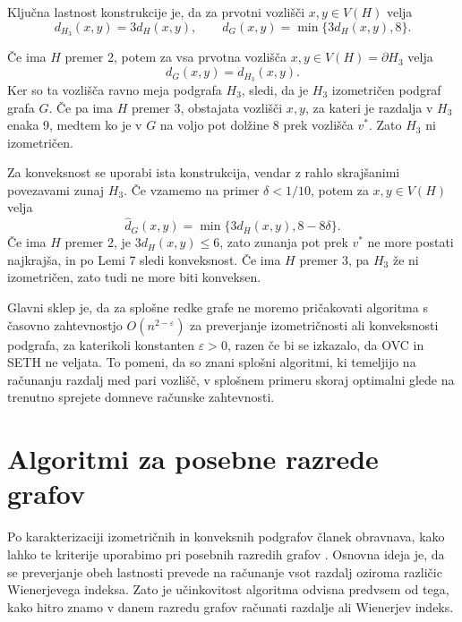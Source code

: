 \documentclass[sigconf
]{acmart}
\theoremstyle{definition}
\begin{document}
Ključna lastnost konstrukcije je, da za prvotni vozlišči \(x,y \in V(H)\) velja
\begin{equation}
d_{H_3}(x,y)=3d_H(x,y),
\qquad
d_G(x,y)=\min\{3d_H(x,y),8\}.
\end{equation}

Če ima \(H\) premer 2, potem za vsa prvotna vozlišča \(x,y\in V(H)=\partial H_3\) velja
\begin{equation}
d_G(x,y)=d_{H_3}(x,y).
\end{equation}
Ker so ta vozlišča ravno meja podgrafa \(H_3\), sledi, da je \(H_3\) izometričen podgraf grafa \(G\). Če pa ima \(H\) premer 3, obstajata vozlišči \(x,y\), za kateri
je razdalja v \(H_3\) enaka 9, medtem ko je v \(G\) na voljo pot dolžine 8 prek vozlišča
\(v^*\). Zato \(H_3\) ni izometričen. 

Za konveksnost se uporabi ista konstrukcija, vendar z rahlo skrajšanimi povezavami zunaj \(H_3\). Če vzamemo na primer \(\delta<1/10\), potem za \(x,y\in V(H)\) velja
\[
\hat d_G(x,y)=\min\{3d_H(x,y),8-8\delta\}.
\]
Če ima \(H\) premer 2, je \(3d_H(x,y)\le 6\), zato zunanja pot prek \(v^*\) ne more postati najkrajša, in po Lemi 7 sledi konveksnost. Če ima \(H\) premer 3, pa \(H_3\) že ni izometričen, zato tudi ne more biti konveksen.



Glavni sklep je, da za splošne redke grafe ne moremo pričakovati algoritma s časovno zahtevnostjo $O(n^{2-\varepsilon})$ za preverjanje izometričnosti ali konveksnosti podgrafa, za katerikoli konstanten $\varepsilon > 0$, razen če bi se izkazalo, da OVC in SETH ne veljata. To pomeni, da so znani splošni algoritmi, ki temeljijo na računanju razdalj med pari vozlišč, v splošnem primeru skoraj optimalni glede na trenutno sprejete domneve računske zahtevnosti.

\section{Algoritmi za posebne razrede grafov}
\label{sec:posebni-razredi}

Po karakterizaciji izometričnih in konveksnih podgrafov članek obravnava, kako lahko te kriterije uporabimo pri posebnih razredih grafov \cite{main_paper}. Osnovna ideja je, da se preverjanje obeh lastnosti prevede na računanje vsot razdalj oziroma različic Wienerjevega indeksa. Zato je učinkovitost algoritma odvisna predvsem od tega, kako hitro znamo v danem razredu grafov računati razdalje ali Wienerjev indeks.
\end{document}
